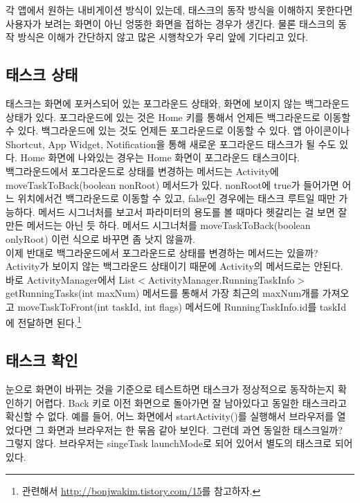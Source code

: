 각 앱에서 원하는 내비게이션 방식이 있는데, 태스크의 동작 방식을 이해하지 못한다면 사용자가 보려는 화면이 아닌 엉뚱한 화면을 접하는 경우가 생긴다. 물론 태스크의 동작 방식은 이해가 간단하지 않고 많은 시행착오가 우리 앞에 기다리고 있다.

\subsection{태스크 상태}
태스크는 화면에 포커스되어 있는 포그라운드 상태와, 화면에 보이지 않는 백그라운드 상태가 있다. 포그라운드에 있는 것은 Home 키를 통해서 언제든 백그라운드로 이동할 수 있다.
백그라운드에 있는 것도 언제든 포그라운드로 이동할 수 있다. 앱 아이콘이나 Shortcut, App Widget, Notification을 통해 새로운 포그라운드 태스크가 될 수도 있다. Home 화면에 나와있는 경우는 Home 화면이 포그라운드 태스크이다.\\

백그라운드에서 포그라운드로 상태를 변경하는 메서드는 Activity에 moveTaskToBack(boolean nonRoot) 메서드가 있다. nonRoot에 true가 들어가면 어느 위치에서건 백그라운드로 이동할 수 있고, false인 경우에는 태스크 루트일 때만 가능하다. 
메서드 시그너처를 보고서 파라미터의 용도를 볼 때마다 헷갈리는 걸 보면 잘 만든 메서드는 아닌 듯 하다. 메서드 시그너처를 moveTaskToBack(boolean onlyRoot) 이런 식으로 바꾸면 좀 낫지 않을까. \\

이제 반대로 백그라운드에서 포그라운드로 상태를 변경하는 메서드는 있을까? 
Activity가 보이지 않는 백그라운드 상태이기 때문에 Activity의 메서드로는 안된다.
바로 ActivityManager에서 
List$<$ActivityManager.Running\-TaskInfo$>$ getRunningTasks(int maxNum) 메서드를 통해서 가장 최근의 maxNum개를 가져오고 moveTaskToFront(int taskId, int flags) 메서드에 RunningTaskInfo.id를 taskId에 전달하면 된다.\footnote{관련해서 \url{http://bonjwakim.tistory.com/15}를 참고하자.}

\subsection{태스크 확인}
눈으로 화면이 바뀌는 것을 기준으로 테스트하면 태스크가 정상적으로 동작하는지 확인하기 어렵다. Back 키로 이전 화면으로 돌아가면 잘 남아있다고 동일한 태스크라고 확신할 수 없다.
예를 들어, 어느 화면에서 startActivity()를 실행해서 브라우저를 열었다면 그 화면과 브라우저는 한 묶음 같아 보인다. 그런데 과연 동일한 태스크일까? 그렇지 않다. 브라우저는 singeTask launchMode로 되어 있어서 별도의 태스크로 되어 있다.\\

